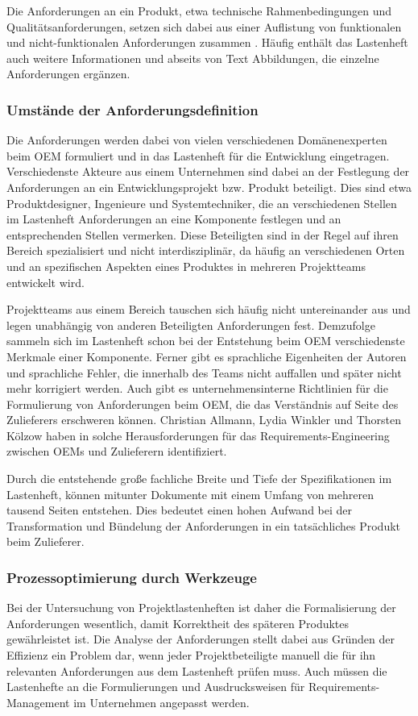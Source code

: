 \documentclass[12pt]{report}
\begin{document}
Die Anforderungen an ein Produkt, etwa technische Rahmenbedingungen und Qualitätsanforderungen, setzen sich dabei aus einer Auflistung von funktionalen und nicht-funktionalen Anforderungen zusammen \cite{bal10}. Häufig enthält das Lastenheft auch weitere Informationen und abseits von Text Abbildungen, die einzelne Anforderungen ergänzen. 

\subsubsection{Umstände der Anforderungsdefinition}
Die Anforderungen werden dabei von vielen verschiedenen Domänenexperten beim OEM formuliert und in das Lastenheft für die Entwicklung eingetragen. Verschiedenste Akteure aus einem Unternehmen sind dabei an der Festlegung der Anforderungen an ein Entwicklungsprojekt bzw. Produkt beteiligt. Dies sind etwa Produktdesigner, Ingenieure und Systemtechniker, die an verschiedenen Stellen im Lastenheft Anforderungen an eine Komponente festlegen und an entsprechenden Stellen vermerken. Diese Beteiligten sind in der Regel auf ihren Bereich spezialisiert und nicht interdisziplinär, da häufig an verschiedenen Orten und an spezifischen Aspekten eines Produktes in mehreren Projektteams entwickelt wird. 

Projektteams aus einem Bereich tauschen sich häufig nicht untereinander aus und legen unabhängig von anderen Beteiligten Anforderungen fest. Demzufolge sammeln sich im Lastenheft schon bei der Entstehung beim OEM verschiedenste Merkmale einer Komponente. Ferner gibt es sprachliche Eigenheiten der Autoren und sprachliche Fehler, die innerhalb des Teams nicht auffallen und später nicht mehr korrigiert werden. Auch gibt es unternehmensinterne Richtlinien für die Formulierung von Anforderungen beim OEM, die das Verständnis auf Seite des Zulieferers erschweren können. Christian Allmann, Lydia Winkler und Thorsten Kölzow haben in \cite{awk06} solche Herausforderungen für das Requirements-Engineering zwischen OEMs und Zulieferern identifiziert.

Durch die entstehende große fachliche Breite und Tiefe der Spezifikationen im Lastenheft, können mitunter Dokumente mit einem Umfang von mehreren tausend Seiten entstehen. Dies bedeutet einen hohen Aufwand bei der Transformation und Bündelung der Anforderungen in ein tatsächliches Produkt beim Zulieferer.  

\subsubsection{Prozessoptimierung durch Werkzeuge}
Bei der Untersuchung von Projektlastenheften ist daher die Formalisierung der Anforderungen wesentlich, damit Korrektheit des späteren Produktes gewährleistet ist. Die Analyse der Anforderungen stellt dabei aus Gründen der Effizienz ein Problem dar, wenn jeder Projektbeteiligte manuell die für ihn relevanten Anforderungen aus dem Lastenheft prüfen muss. Auch müssen die Lastenhefte an die Formulierungen und Ausdrucksweisen für Requirements-Management im Unternehmen angepasst werden. 
\end{document}
